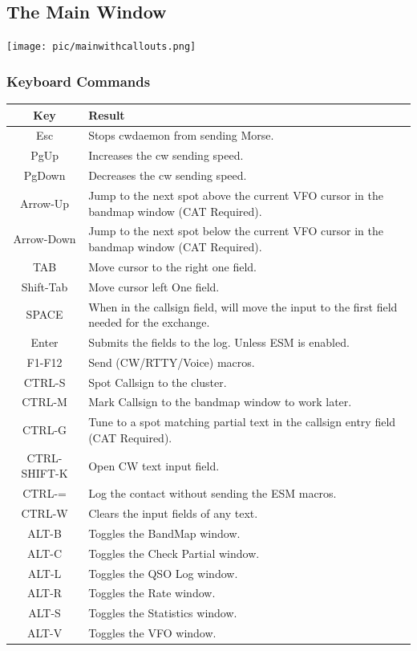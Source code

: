\documentclass{article}
\begin{document}
\subsection{The Main Window}

\vspace{0.5cm}
\texttt{[image: pic/mainwithcallouts.png]}
\vspace{0.5cm}

\subsubsection{Keyboard Commands}

\begin{tabular}{| c | p{9cm} |}
    \hline
    \textbf{Key} & \textbf{Result} \\
    \hline
    Esc & Stops cwdaemon from sending Morse.\\
    \hline
    PgUp & Increases the cw sending speed. \\
    \hline
    PgDown & Decreases the cw sending speed. \\
    \hline
    Arrow-Up & Jump to the next spot above the current VFO cursor in the bandmap window (CAT Required). \\
    \hline
    Arrow-Down & Jump to the next spot below the current VFO cursor in the bandmap window (CAT Required). \\
    \hline
    TAB & Move cursor to the right one field. \\
    \hline
    Shift-Tab & Move cursor left One field. \\
    \hline
    SPACE & When in the callsign field, will move the input to the first field needed for the exchange. \\
    \hline
    Enter & Submits the fields to the log. Unless ESM is enabled. \\
    \hline
    F1-F12 & Send (CW/RTTY/Voice) macros. \\
    \hline
    CTRL-S & Spot Callsign to the cluster. \\
    \hline
    CTRL-M & Mark Callsign to the bandmap window to work later. \\
    \hline
    CTRL-G & Tune to a spot matching partial text in the callsign entry field (CAT Required). \\
    \hline
    CTRL-SHIFT-K & Open CW text input field. \\
    \hline
    CTRL-= & Log the contact without sending the ESM macros. \\
    \hline
    CTRL-W & Clears the input fields of any text. \\
    \hline
    ALT-B	& Toggles the BandMap window. \\
    \hline
    ALT-C	& Toggles the Check Partial window. \\
    \hline
    ALT-L	& Toggles the QSO Log window. \\
    \hline
    ALT-R	& Toggles the Rate window. \\
    \hline
    ALT-S	& Toggles the Statistics window. \\
    \hline
    ALT-V	& Toggles the VFO window. \\
    \hline
\end{tabular}
\end{document}
